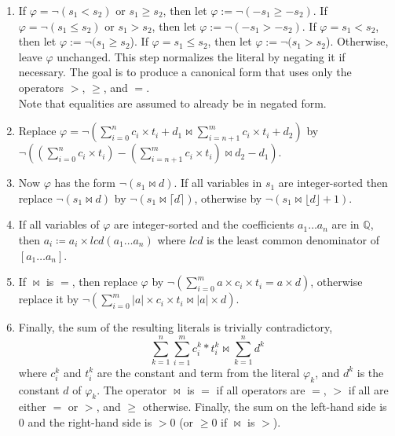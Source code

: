 \begin{enumerate}
    \item If $\varphi =  \neg (s_1 < s_2)$  or $s_1 \geq s_2$, then let $\varphi := \neg(- s_1 \geq - s_2)$.
    If $\varphi =  \neg (s_1 \leq s_2)$ or $s_1 > s_2$, then let $\varphi := \neg(- s_1 > - s_2)$.
    If $\varphi = s_1 < s_2$, then let $\varphi := \neg(s_1 \geq s_2$).
    If $\varphi = s_1 \leq s_2$, then let $\varphi := \neg(s_1 > s_2$).
    Otherwise, leave $\varphi$ unchanged.
    This step normalizes the literal by negating it if necessary.
    The goal is to produce a canonical form that uses only the operators $>$, $\geq$, and $=$.\\
    Note that equalities are assumed to already be in negated form.


    \item Replace $\varphi = \neg (\sum_{i=0}^{n}c_i\times{}t_i + d_1 \bowtie \sum_{i=n+1}^{m} c_i\times{}t_i + d_2)$ by $\neg (\left(\sum_{i=0}^{n}c_i\times{}t_i\right) - \left(\sum_{i=n+1}^{m} c_i\times{}t_i\right)
    \bowtie d_2 - d_1)$.

    \item \label{la_generic:str}Now $\varphi$ has the form $\neg (s_1 \bowtie d)$. If all
    variables in $s_1$ are integer-sorted then replace $\neg (s_1 \bowtie d)$ by $\neg (s_1 \bowtie \lceil d \rceil)$,
    otherwise by $\neg (s_1 \bowtie \lfloor d\rfloor + 1)$.

    \item If all variables of $\varphi$ are integer-sorted and the coefficients $a_1 \dots a_n$ are in $\mathbb{Q}$,
    then $a_i \coloneq a_i \times \mathit{lcd}(a_1 \dots a_n)$ where $\mathit{lcd}$ is the least common denominator of $[a_1 \dots a_n]$.

    \item If $\bowtie$ is $=$, then replace $\varphi$ by
    $\neg (\sum_{i=0}^{m}a\times{}c_i\times{}t_i = a\times{}d)$, otherwise replace it by
    $\neg (\sum_{i=0}^{m}|a|\times{}c_i\times{}t_i \bowtie |a|\times{}d)$.

    \item Finally, the sum of the resulting literals is trivially contradictory,
    \[
        \sum_{k=1}^{n}\sum_{i=1}^{m}c_i^k*t_i^k \bowtie \sum_{k=1}^{n}d^k
    \]
  where $c_i^k$ and $t_i^k$ are the constant and term from the literal $\varphi_k$, and $d^k$ is the constant $d$ of $\varphi_k$.
  The operator $\bowtie$ is $=$ if all operators are $=$, $>$ if all are either $=$ or $>$, and $\geq$ otherwise. Finally, the sum on the left-hand side is $0$ and the right-hand side is $>0$ (or $\geq 0$ if $\bowtie$ is $>$).

\end{enumerate}

